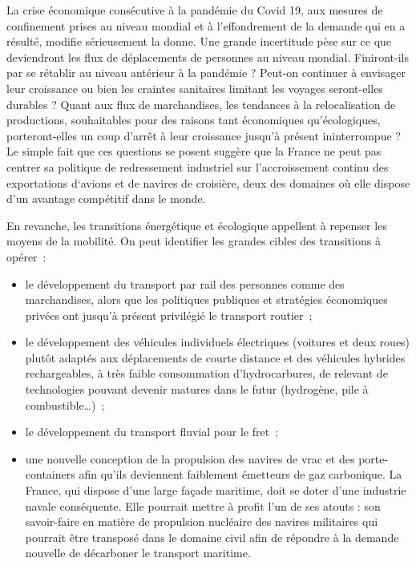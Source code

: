 \documentclass[a4paper]{article}
\begin{document}
La crise économique consécutive à la pandémie du Covid 19, aux mesures de confinement prises au niveau mondial et à l’effondrement de la demande qui en a résulté, modifie sérieusement la donne. Une grande incertitude pèse sur ce que deviendront les flux de déplacements de personnes au niveau mondial. Finiront-ils par se rétablir au niveau antérieur à la pandémie ? Peut-on continuer à envisager leur croissance ou bien les craintes sanitaires limitant les voyages seront-elles durables ?  Quant aux flux de marchandises, les tendances à la relocalisation de productions, souhaitables pour des raisons tant économiques qu’écologiques, porteront-elles un coup d’arrêt à leur croissance jusqu’à présent ininterrompue ? Le simple fait que ces questions se posent suggère que la France ne peut pas  centrer sa politique de redressement industriel sur l’accroissement continu des exportations d‘avions et de navires de croisière, deux des domaines où elle dispose d’un avantage compétitif dans le monde.

En revanche, les transitions énergétique et écologique appellent à repenser les moyens de la mobilité. On peut identifier les grandes cibles des transitions à opérer~:
\begin{itemize}
\item le développement du transport par rail des personnes comme des marchandises, alors que les politiques publiques et stratégies économiques privées ont jusqu’à présent privilégié le transport routier~;
\item le développement des véhicules individuels électriques (voitures et deux roues) plutôt adaptés aux déplacements de courte distance et des véhicules hybrides rechargeables, à très faible consommation d’hydrocarbures, de relevant de technologies pouvant devenir matures dans le futur (hydrogène, pile à combustible…)~;
\item le développement du transport fluvial pour le fret~;
\item une nouvelle conception de la propulsion des navires de vrac et des porte-containers afin qu’ils deviennent faiblement émetteurs de gaz carbonique. La France, qui dispose d’une large façade maritime, doit se doter d’une industrie navale conséquente. Elle pourrait mettre à profit l’un de ses atouts : son savoir-faire en matière de propulsion nucléaire des navires militaires qui pourrait être transposé dans le domaine civil afin de répondre à la demande nouvelle de décarboner le transport maritime.

\end{itemize}
\end{document}
